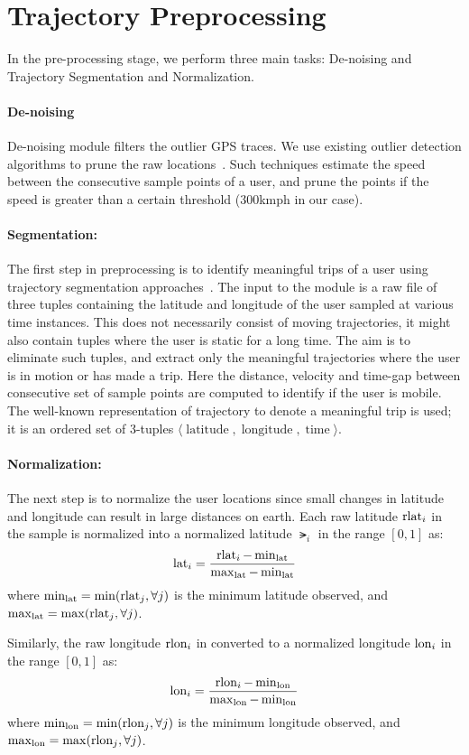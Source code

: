 \section{Trajectory Preprocessing}
\label{sec:preprocess}

In the pre-processing stage, we perform three main tasks: De-noising and Trajectory Segmentation and Normalization. 

\paragraph{De-noising}
De-noising module filters the outlier GPS traces. We use existing outlier detection algorithms to prune the raw locations~\cite{Yuan2013,Zheng2009}. Such techniques estimate the speed between the consecutive sample points of a user, and prune the points if the speed is greater than a certain threshold (\unit{300}{kmph} in our case).


\paragraph{Segmentation:}
The first step in preprocessing is to identify meaningful trips of a user using trajectory segmentation approaches~\cite{Zheng2008}. The input to the module is a raw file of three tuples containing the latitude and longitude of the user sampled at various time instances. This does not necessarily consist of moving trajectories, it might also contain tuples where the user is static for a long time. The aim is to eliminate such tuples, and extract only the meaningful trajectories where the user is in motion or has made a trip. Here the distance, velocity and time-gap between consecutive set of sample points are computed to identify if the user is mobile. The well-known representation of trajectory to denote a meaningful trip is used; it is an ordered set of 3-tuples $\langle \operatorname{latitude},\operatorname{longitude},\operatorname{time} \rangle$.

\paragraph{Normalization:}
The next step is to normalize the user locations since small changes in latitude and longitude can result in large distances on earth. Each raw latitude $\operatorname{rlat}_i$ in the sample is normalized into a normalized latitude $\lat_i$ in the range $[0,1]$ as:
\begin{eqnarray}
\operatorname{lat}_i =\frac{\operatorname{rlat}_i - \min_{\operatorname{lat}}}{\max_{\operatorname{lat}} - \min_{\operatorname{lat}}}
\end{eqnarray}
where $\min_{\operatorname{lat}}=\min(\operatorname{rlat}_j, \forall j)$ is the minimum latitude observed, and $\max_{\operatorname{lat}}=\max(\operatorname{rlat}_j, \forall j)$. 

Similarly, the raw longitude $\operatorname{rlon}_i$ in converted to a normalized longitude $\operatorname{lon}_i$ in the range $[0,1]$ as:
\begin{eqnarray}
\operatorname{lon}_i =\frac{\operatorname{rlon}_i - \min_{\operatorname{lon}}}{\max_{\operatorname{lon}} - \min_{\operatorname{lon}}}
\end{eqnarray}
where $\min_{\operatorname{lon}}=\min(\operatorname{rlon}_j, \forall j)$ is the minimum longitude observed, and $\max_{\operatorname{lon}}=\max(\operatorname{rlon}_j, \forall j)$. 
